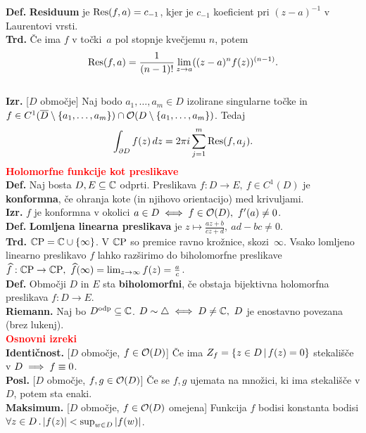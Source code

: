 \documentclass[a4paper,oneside,8pt,landscape]{extarticle}
\begin{document}
\begin{multicols*}{3}
\textbf{Def.} \textbf{Residuum} je \(\operatorname{Res}(f, a) = c_{-1}\), kjer je \(c_{-1}\) koeficient pri \((z-a)^{-1}\) v Laurentovi vrsti.\\
%
\textbf{Trd.} Če ima \(f\) v točki\ \(a\) pol stopnje kvečjemu \(n\), potem 
\[\operatorname{Res}(f, a) = \frac{1}{(n-1)!} \lim_{z \to a} ((z-a)^nf(z))^{(n-1)}.\]\\
%
\textbf{Izr.} [\(D\) območje] Naj bodo \(a_1, \ldots, a_m \in D\) izolirane singularne točke in \(f \in C^1(\overline{D} \setminus \{a_1, \ldots, a_m\}) \cap \mathcal{O}(D \setminus \{a_1, \ldots, a_m\})\). Tedaj 
\[
    \int_{\partial D} f(z)\, dz = 2 \pi i \sum_{j=1}^{m} \operatorname{Res}(f, a_j).
\]
\textbf{\textcolor{red}{Holomorfne funkcije kot preslikave}}\\
\textbf{Def.} Naj bosta \(D, E \subseteq \mathbb{C}\) odprti. Preslikava \(f: D \to E,\ f \in C^1(D)\) je \textbf{konformna}, če ohranja kote (in njihovo orientacijo) med krivuljami.\\
\textbf{Izr.} \(f\) je konformna v okolici \(a \in D \iff f \in \mathcal{O}(D),\ f'(a) \neq 0\).\\ 
\textbf{Def.} \textbf{Lomljena linearna preslikava} je \(z \mapsto \frac{az+b}{cz+d}, \ ad-bc \neq 0\).\\
\textbf{Trd.} \(\operatorname{\mathbb{C} P} = \mathbb{C} \cup \{\infty\}\). V \(\operatorname{\mathbb{C} P}\) so premice ravno krožnice, skozi~\(\infty\). Vsako lomljeno linearno preslikavo \(f\) lahko razširimo do biholomorfne preslikave \(\widehat{f}: \operatorname{\mathbb{C} P} \to \operatorname{\mathbb{C} P},\ \widehat{f}(\infty) = \lim_{z \to \infty} f(z) = \frac{a}{c}\).\\
\textbf{Def.} Območji \(D\) in \(E\) sta \textbf{biholomorfni}, če obstaja bijektivna holomorfna preslikava \(f: D \to E\).\\
\textbf{Riemann.} Naj bo \(D^\text{odp} \subseteq \mathbb{C}\). \(D \sim \triangle \iff D \neq \mathbb{C},\ D\) je enostavno povezana (brez lukenj).\\
\textbf{\textcolor{red}{Osnovni izreki}}\\
%
\textbf{Identičnost.} [\(D\) območje, \(f \in \mathcal{O}(D)\)] Če ima \(Z_f = \{z \in D \,|\, f(z) = 0\}\) stekališče v \(D \implies f \equiv 0\).\\
%
\textbf{Posl.} [\(D\) območje, \(f, g \in \mathcal{O}(D)\)] Če se \(f, g\) ujemata na množici, ki ima stekališče v \(D\), potem sta enaki.\\
%
\textbf{Maksimum.} [\(D\) območje, \(f \in \mathcal{O}(D)\) omejena] Funkcija \(f\) bodisi konstanta bodisi \(\forall z \in D \,.\, |f(z)| < \sup_{w \in D} |f(w)|\).\\

\end{multicols*}
\end{document}
